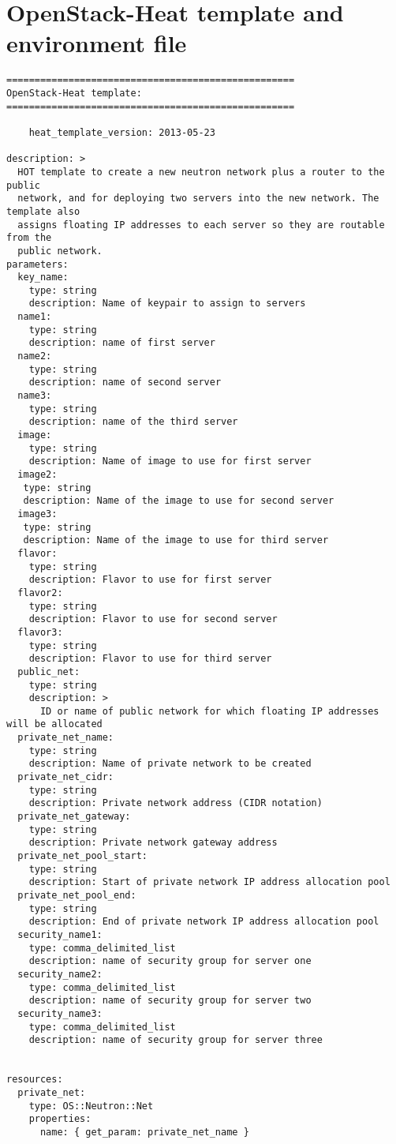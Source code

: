 \section{OpenStack-Heat template and environment file}
\begin{verbatim}
===================================================
OpenStack-Heat template:
===================================================

    heat_template_version: 2013-05-23

description: >
  HOT template to create a new neutron network plus a router to the public
  network, and for deploying two servers into the new network. The template also
  assigns floating IP addresses to each server so they are routable from the
  public network.
parameters:
  key_name:
    type: string
    description: Name of keypair to assign to servers  
  name1:
    type: string
    description: name of first server
  name2:
    type: string
    description: name of second server
  name3:
    type: string
    description: name of the third server
  image:
    type: string
    description: Name of image to use for first server
  image2:
   type: string 
   description: Name of the image to use for second server  
  image3:
   type: string 
   description: Name of the image to use for third server
  flavor:
    type: string
    description: Flavor to use for first server
  flavor2:
    type: string
    description: Flavor to use for second server
  flavor3:
    type: string
    description: Flavor to use for third server
  public_net:
    type: string
    description: >
      ID or name of public network for which floating IP addresses will be allocated
  private_net_name:
    type: string
    description: Name of private network to be created
  private_net_cidr:
    type: string
    description: Private network address (CIDR notation)
  private_net_gateway:
    type: string
    description: Private network gateway address
  private_net_pool_start:
    type: string
    description: Start of private network IP address allocation pool
  private_net_pool_end:
    type: string
    description: End of private network IP address allocation pool
  security_name1:
    type: comma_delimited_list
    description: name of security group for server one
  security_name2:
    type: comma_delimited_list
    description: name of security group for server two
  security_name3:
    type: comma_delimited_list
    description: name of security group for server three


resources:
  private_net:
    type: OS::Neutron::Net
    properties:
      name: { get_param: private_net_name }


\end{verbatim}

